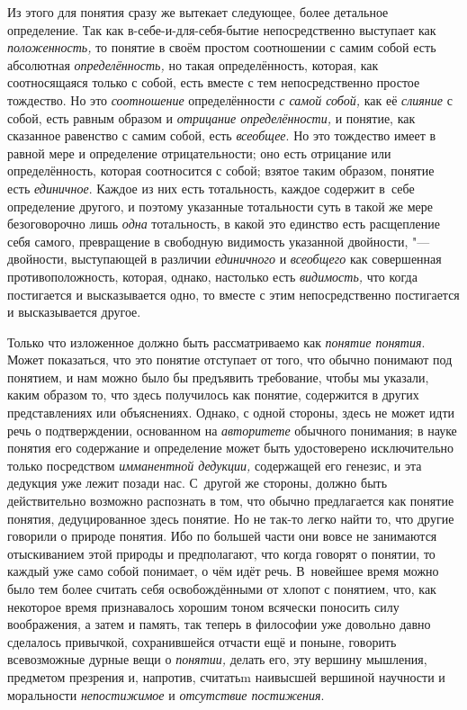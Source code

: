 Из этого для понятия сразу же вытекает следующее, более детальное
определение. Так как в-себе-и-для-себя-бытие непосредственно выступает как
{\em положенность,} то понятие в своём простом соотношении с самим собой есть
абсолютная {\em определённость,} но такая определённость, которая, как
соотносящаяся только с собой, есть вместе с тем непосредственно простое
тождество. Но это {\em соотношение} определённости {\em с самой собой,} как
её {\em слияние} с собой, есть равным образом и {\em отрицание определённости,}
и понятие, как сказанное равенство с самим собой, есть {\em всеобщее}.
Но это тождество имеет в равной мере и определение отрицательности; оно есть
отрицание или определённость, которая соотносится с собой; взятое таким
образом, понятие есть {\em единичное}. Каждое из них есть тотальность, каждое
содержит в~себе определение другого, и поэтому указанные тотальности суть в
такой же мере безоговорочно лишь {\em одна} тотальность, в какой это
единство есть расщепление себя самого, превращение в свободную видимость
указанной двойности, "--- двойности, выступающей в различии {\em единичного}
и {\em всеобщего} как совершенная противоположность, которая, однако, настолько
есть {\em видимость,} что когда постигается и высказывается одно, то вместе
с этим непосредственно постигается и высказывается другое.

Только что изложенное должно быть рассматриваемо как {\em понятие понятия}.
Может показаться, что это понятие отступает от того, что обычно понимают под
понятием, и нам можно было бы предъявить требование, чтобы мы указали, каким
образом то, что здесь получилось как понятие, содержится в других
представлениях или объяснениях. Однако, с одной стороны, здесь не может идти
речь о подтверждении, основанном на {\em авторитете} обычного понимания; в
науке понятия его содержание и определение может быть удостоверено
исключительно только посредством {\em имманентной дедукции,} содержащей его
генезис, и эта дедукция уже лежит позади нас. С~другой же стороны, должно
быть действительно возможно распознать в том, что обычно предлагается как
понятие понятия, дедуцированное здесь понятие. Но не так-то легко найти то,
что другие говорили о природе понятия. Ибо по большей части они вовсе не
занимаются отыскиванием этой природы и предполагают, что когда говорят о
понятии, то каждый уже само собой понимает, о чём идёт речь. В~новейшее
время можно было тем более считать себя освобождёнными от хлопот с понятием,
что, как некоторое время признавалось хорошим тоном всячески поносить силу
воображения, а затем и память, так теперь в философии уже довольно давно
сделалось привычкой, сохранившейся отчасти ещё и поныне, говорить
всевозможные дурные вещи о {\em понятии,} делать его, эту вершину мышления,
предметом презрения и, напротив, считатьm наивысшей вершиной научности и
моральности {\em непостижимое} и {\em отсутствие постижения}.

